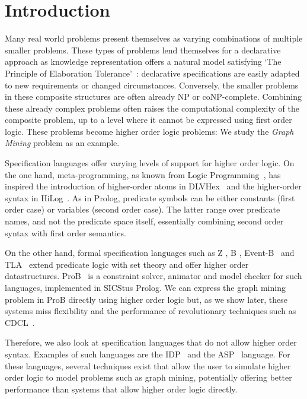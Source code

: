 
\section{Introduction}
Many real world problems present themselves as varying combinations of multiple smaller problems. 
These types of problems lend themselves for a declarative approach as knowledge representation offers a natural model satisfying `The Principle of Elaboration Tolerance'~\citep{elaboration_tolerance}: 
declarative specifications are easily adapted to new requirements or changed circumstances.
Conversely, the smaller problems in these composite structures are often already NP or coNP-complete.
Combining these already complex problems often raises the computational complexity of the composite problem, up to a level where it cannot be expressed using first order logic.
These problems become higher order logic problems: We study the \emph{Graph Mining} problem as an example.

Specification languages offer varying levels of support for higher order logic.
On the one hand, meta-programming, as known from Logic Programming~\citep{abramson1989meta}, has inspired the introduction of higher-order atoms in DLVHex~\citep{conf/ijcai/EiterIST05}  and the higher-order syntax in HiLog~\citep{chen1993hilog}.
As in Prolog, predicate symbols can be either constants (first order case) or variables (second order case). The latter range over predicate names, and not the predicate space itself, essentially combining second order syntax with first order semantics. 

On the other hand, formal specification languages such as Z \citep{Bowen:Z}, B \citep{Abrial:BBook}, Event-B~\citep{Abrial10} and TLA~\citep{books/aw/Lamport2002}
 extend predicate logic with set theory and offer higher order datastructures. ProB~\citep{journals/sttt/LeuschelB08} is a constraint solver, animator and model checker for such languages, implemented in SICStus Prolog.
We can express the graph mining problem in ProB directly using higher order logic but, as we show later, these systems miss flexibility and the performance of revolutionary techniques such as CDCL~\citep{DBLP:conf/iccad/SilvaS96}.

Therefore, we also look at specification languages that do not allow higher order syntax.
Examples of such languages are the IDP~\citep{WarrenBook/DeCatBBD16} and the ASP~\citep{conf/rweb/EiterIK09} language.
For these languages, several techniques exist that allow the user to simulate higher order logic to model problems such as graph mining, potentially offering better performance than systems that allow higher order logic directly.

